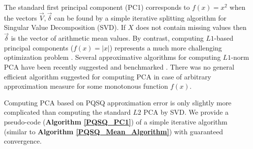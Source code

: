 \documentclass[preprint,12pt]{elsarticle}
\begin{document}
The standard first principal component (PC1) corresponds to $f(x)=x^2$ when the vectors $\vec{V}, \vec{\delta}$ can be found by a simple iterative splitting algorithm for Singular Value Decomposition (SVD). If $X$ does not contain missing values then $\vec{\delta}$ is the vector of arithmetic mean values. By contrast, computing $L1$-based principal components ($f(x)=|x|$) represents a much more challenging optimization problem \cite{Brooks2013}. Several approximative algorithms for computing $L1$-norm PCA have been recently suggested and benchmarked \cite{}. There was no general efficient algorithm suggested for computing PCA in case of arbitrary approximation measure for some monotonous function $f(x)$.

Computing PCA based on PQSQ approximation error is only slightly more complicated than computing the standard $L2$ PCA by SVD. We provide a pseudo-code (\textbf{Algorithm \ref{PQSQ_PC1}}) of a simple iterative algorithm (similar to \textbf{Algorithm \ref{PQSQ_Mean_Algorithm}}) with guaranteed convergence.
\end{document}

